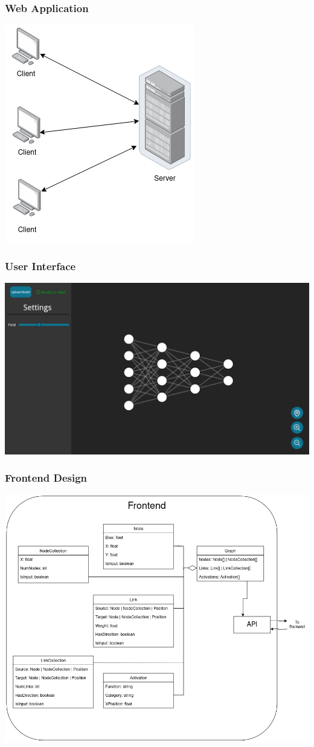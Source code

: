 \documentclass{beamer}
\begin{document}
\begin{frame}
    \frametitle{Web Application} 
    \centering
    \includegraphics[scale=0.5]{res/client_server.png}
\end{frame}

\begin{frame}
    \frametitle{User Interface}
    \centering
    \includegraphics[scale=0.15]{../../docs/mockups/Main.png}
\end{frame}

\begin{frame}
    \frametitle{Frontend Design} 
    \centering
    \includegraphics[scale=0.25]{../../docs/diagrams/class_diagram_frontend.png}
\end{frame}
\end{document}
